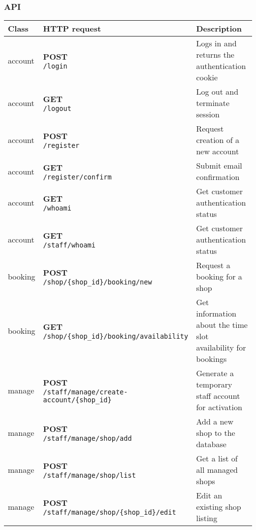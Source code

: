 \subsubsection{API}


\begin{tabularx}{\textwidth}{|p{}|l|X|} \hline
\textbf{Class} & \textbf{HTTP request} & \textbf{Description} \\\hline\endhead
account & \makecell{\textbf{POST} \\ \texttt{/login}}  & Logs in and returns the authentication  cookie \\\hline
account & \makecell{\textbf{GET} \\ \texttt{/logout}}  & Log out and terminate session \\\hline
account & \makecell{\textbf{POST} \\ \texttt{/register}}  & Request creation of a new account \\\hline
account & \makecell{\textbf{GET} \\ \texttt{/register/confirm}}  & Submit email confirmation \\\hline
account & \makecell{\textbf{GET} \\ \texttt{/whoami}}  & Get customer authentication status \\\hline
account & \makecell{\textbf{GET} \\ \texttt{/staff/whoami}}  & Get customer authentication status \\\hline
booking & \makecell{\textbf{POST} \\ \texttt{/shop/\{shop\_id\}/booking/new}}  & Request a booking for a shop \\\hline
booking & \makecell{\textbf{GET} \\ \texttt{/shop/\{shop\_id\}/booking/availability}}  & Get information about the time slot availability for bookings \\\hline
manage & \makecell{\textbf{POST} \\ \texttt{/staff/manage/create-account/\{shop\_id\}}}  & Generate a temporary staff account for activation \\\hline
manage & \makecell{\textbf{POST} \\ \texttt{/staff/manage/shop/add}}  & Add a new shop to the database \\\hline
manage & \makecell{\textbf{POST} \\ \texttt{/staff/manage/shop/list}}  & Get a list of all managed shops \\\hline
manage & \makecell{\textbf{POST} \\ \texttt{/staff/manage/shop/\{shop\_id\}/edit}}  & Edit an existing shop listing \\\hline

\end{tabularx}
